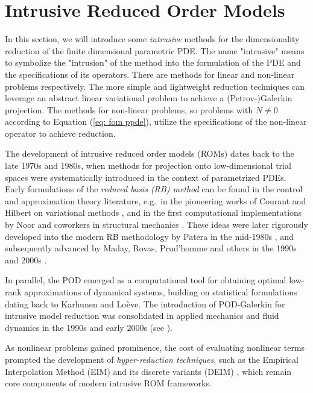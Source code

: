 \section{Intrusive Reduced Order Models}


In this section, we will introduce some \emph{intrusive} methods for the dimensionality reduction of the finite
dimensional parametric PDE. The name "intrusive" means to symbolize the "intrusion" of the method into the formulation
of the PDE and the specifications of its operators. There are methods for linear and non-linear
problems respectively. The more simple and lightweight reduction techniques can leverage an abstract linear variational
problem to achieve a (Petrov-)Galerkin projection. The methods for non-linear problems, so problems with $N \neq 0$
according to Equation (\ref{eq: fom ppde}), utilize the specifications of the non-linear operator to achieve reduction.

\begin{remark}
    The development of intrusive reduced order models (ROMs) dates back to the 
    late 1970s and 1980s, when methods for projection onto low-dimensional trial 
    spaces were systematically introduced in the context of parametrized PDEs. 
    Early formulations of the \emph{reduced basis (RB) method} can be found in the 
    control and approximation theory literature, e.g.\ in the pioneering works of 
    Courant and Hilbert on variational methods \cite{couranthilbert1953}, and in 
    the first computational implementations by Noor and coworkers 
    in structural mechanics \cite{noor1980}. These ideas were later rigorously 
    developed into the modern RB methodology by Patera in the mid-1980s 
    \cite{patera1984}, and subsequently advanced by Maday, Rovas, Prud'homme and 
    others in the 1990s and 2000s \cite{maday2002,prudhomme2002}.  

    In parallel, the POD emerged as a 
    computational tool for obtaining optimal low-rank approximations of 
    dynamical systems, building on statistical formulations dating back to 
    Karhunen and Loève. The introduction of POD-Galerkin for intrusive model 
    reduction was consolidated in applied mechanics and fluid dynamics in the 
    1990s and early 2000s (see \cite{holmes1996,kunischvolkwein2001}).  

    As nonlinear problems gained prominence, the cost of evaluating nonlinear terms 
    prompted the development of \emph{hyper-reduction techniques}, such as the 
    Empirical Interpolation Method (EIM) \cite{barrault2004} and its discrete 
    variants (DEIM) \cite{chaturantabut2010}, which remain core components of 
    modern intrusive ROM frameworks.  
\end{remark}


